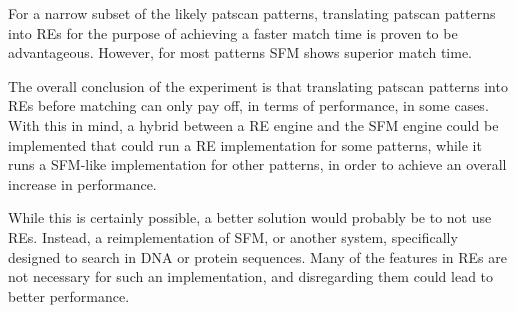 \documentclass[12pt]{article}
\theoremstyle{definition}
\begin{document}
For a narrow subset of the likely patscan patterns, translating patscan patterns into REs for the purpose of achieving a faster match time is proven to be advantageous. However, for most patterns SFM shows superior match time.

The overall conclusion of the experiment is that translating patscan patterns into REs before matching can only pay off, in terms of performance, in some cases. With this in mind, a hybrid between a RE engine and the SFM engine could be implemented that could run a RE implementation for some patterns, while it runs a SFM-like implementation for other patterns, in order to achieve an overall increase in performance.

While this is certainly possible, a better solution would probably be to not use REs. Instead, a reimplementation of SFM, or another system, specifically designed to search in DNA or protein sequences. Many of the features in REs are not necessary for such an implementation, and disregarding them could lead to better performance.


\newpage


\nocite{*}

\end{document}
